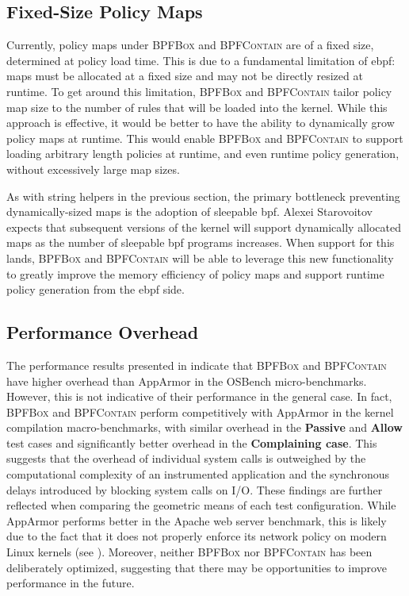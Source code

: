 \documentclass[
  fontsize=12pt,
  titlepage=firstiscover,
  paper=letter,
oneside,
  cleardoublepage=plain,
  parskip=half-,
  DIV=10,
  parindent,
  appendixprefix,
  chapterprefix,
  listof=totoc,
]{scrbook}
\newcommand{\bpfbox}{\textsc{BPFBox}}
\newcommand{\bpfcontain}{\textsc{BPFContain}}
\begin{document}
\subsection{Fixed-Size Policy Maps}

Currently, policy maps under \bpfbox{} and \bpfcontain{} are of a fixed size, determined
at policy load time. This is due to a fundamental limitation of \gls{ebpf}: maps must be
allocated at a fixed size and may not be directly resized at runtime. To get around this
limitation, \bpfbox{} and \bpfcontain{} tailor policy map size to the number of rules that
will be loaded into the kernel. While this approach is effective, it would be better to
have the ability to dynamically grow policy maps at runtime. This would enable \bpfbox{}
and \bpfcontain{} to support loading arbitrary length policies at runtime, and even
runtime policy generation, without excessively large map sizes.

As with string helpers in the previous section, the primary bottleneck preventing
dynamically-sized maps is the adoption of sleepable \gls{bpf}. Alexei Starovoitov expects
that subsequent versions of the kernel will support dynamically allocated maps as the
number of sleepable \gls{bpf} programs increases. When support for this lands, \bpfbox{}
and \bpfcontain{} will be able to leverage this new functionality to greatly improve the
memory efficiency of policy maps and support runtime policy generation from the \gls{ebpf}
side.

















\subsection{Performance Overhead}

The performance results presented in  indicate that \bpfbox{} and
\bpfcontain{} have higher overhead than AppArmor in the OSBench micro-benchmarks.
However, this is not indicative of their performance in the general case. In fact,
\bpfbox{} and \bpfcontain{} perform competitively with AppArmor in the kernel compilation
macro-benchmarks, with similar overhead in the \textbf{Passive} and \textbf{Allow} test
cases and significantly better overhead in the \textbf{Complaining case}. This suggests
that the overhead of individual system calls is outweighed by the computational complexity
of an instrumented application and the synchronous delays introduced by blocking system
calls on I/O. These findings are further reflected when comparing the geometric means of
each test configuration. While AppArmor performs better in the Apache web server
benchmark, this is likely due to the fact that it does not properly enforce its network
policy on modern Linux kernels (see ). Moreover, neither
\bpfbox{} nor \bpfcontain{} has been deliberately optimized, suggesting that there may be
opportunities to improve performance in the future.
\end{document}

